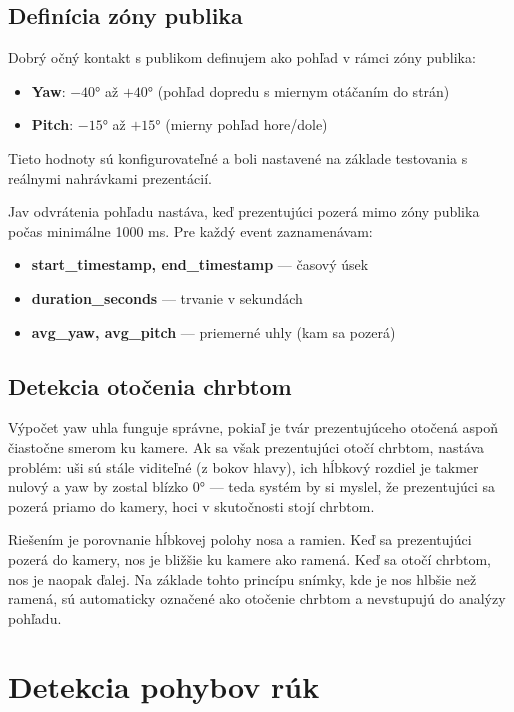 \subsection{Definícia zóny publika}

Dobrý očný kontakt s publikom definujem ako pohľad v rámci zóny publika:
\begin{itemize}
    \item \textbf{Yaw}: $-40°$ až $+40°$ (pohľad dopredu s miernym otáčaním do strán)
    \item \textbf{Pitch}: $-15°$ až $+15°$ (mierny pohľad hore/dole)
\end{itemize}
Tieto hodnoty sú konfigurovateľné a boli nastavené na základe testovania s reálnymi nahrávkami prezentácií.

Jav odvrátenia pohľadu nastáva, keď prezentujúci pozerá mimo zóny publika počas minimálne 1000 ms.
Pre každý event zaznamenávam:

\begin{itemize}
    \item \textbf{start\_timestamp, end\_timestamp} --- časový úsek
    \item \textbf{duration\_seconds} --- trvanie v sekundách
    \item \textbf{avg\_yaw, avg\_pitch} --- priemerné uhly (kam sa pozerá)
\end{itemize}

\subsection{Detekcia otočenia chrbtom}

Výpočet yaw uhla funguje správne, pokiaľ je tvár prezentujúceho otočená aspoň čiastočne smerom ku kamere. Ak sa však prezentujúci otočí chrbtom, nastáva problém: uši sú stále viditeľné (z bokov hlavy), ich hĺbkový rozdiel je takmer nulový a yaw by zostal blízko 0° --- teda systém by si myslel, že prezentujúci sa pozerá priamo do kamery, hoci v skutočnosti stojí chrbtom.

Riešením je porovnanie hĺbkovej polohy nosa a ramien. Keď sa prezentujúci pozerá do kamery, nos je bližšie ku kamere ako ramená. Keď sa otočí chrbtom, nos je naopak ďalej. Na základe tohto princípu snímky, kde je nos hlbšie než ramená, sú automaticky označené ako otočenie chrbtom a nevstupujú do analýzy pohľadu.

\section{Detekcia pohybov rúk}


